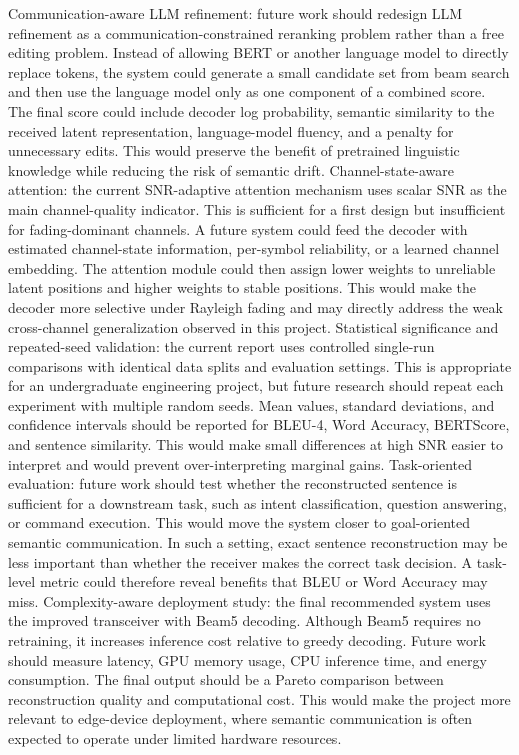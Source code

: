 Communication-aware LLM refinement: future work should redesign LLM refinement as a communication-constrained reranking problem rather than a free editing problem. Instead of allowing BERT or another language model to directly replace tokens, the system could generate a small candidate set from beam search and then use the language model only as one component of a combined score. The final score could include decoder log probability, semantic similarity to the received latent representation, language-model fluency, and a penalty for unnecessary edits. This would preserve the benefit of pretrained linguistic knowledge while reducing the risk of semantic drift.
Channel-state-aware attention: the current SNR-adaptive attention mechanism uses scalar SNR as the main channel-quality indicator. This is sufficient for a first design but insufficient for fading-dominant channels. A future system could feed the decoder with estimated channel-state information, per-symbol reliability, or a learned channel embedding. The attention module could then assign lower weights to unreliable latent positions and higher weights to stable positions. This would make the decoder more selective under Rayleigh fading and may directly address the weak cross-channel generalization observed in this project.
Statistical significance and repeated-seed validation: the current report uses controlled single-run comparisons with identical data splits and evaluation settings. This is appropriate for an undergraduate engineering project, but future research should repeat each experiment with multiple random seeds. Mean values, standard deviations, and confidence intervals should be reported for BLEU-4, Word Accuracy, BERTScore, and sentence similarity. This would make small differences at high SNR easier to interpret and would prevent over-interpreting marginal gains.
Task-oriented evaluation: future work should test whether the reconstructed sentence is sufficient for a downstream task, such as intent classification, question answering, or command execution. This would move the system closer to goal-oriented semantic communication. In such a setting, exact sentence reconstruction may be less important than whether the receiver makes the correct task decision. A task-level metric could therefore reveal benefits that BLEU or Word Accuracy may miss.
Complexity-aware deployment study: the final recommended system uses the improved transceiver with Beam5 decoding. Although Beam5 requires no retraining, it increases inference cost relative to greedy decoding. Future work should measure latency, GPU memory usage, CPU inference time, and energy consumption. The final output should be a Pareto comparison between reconstruction quality and computational cost. This would make the project more relevant to edge-device deployment, where semantic communication is often expected to operate under limited hardware resources.
